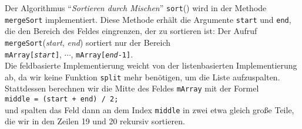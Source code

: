 Der Algorithmus ``\emph{Sortieren durch Mischen}'' \texttt{sort}() wird in der Methode
\texttt{mergeSort} implementiert.  Diese Methode erh\"alt die Argumente  \texttt{start} und
\texttt{end}, die den  Bereich des Feldes eingrenzen, der zu sortieren ist: 
Der Aufruf \texttt{mergeSort}(\textsl{start}, \textsl{end}) sortiert nur der Bereich \\[0.1cm]
\hspace*{1.3cm} \texttt{mArray[\textsl{start}]}, $\cdots$, \texttt{mArray[\textsl{end}-1]}. \\[0.1cm]
Die feldbasierte Implementierung  weicht von der listenbasierten Implementierung ab, da
wir keine Funktion \texttt{split} mehr ben\"otigen, um die Liste aufzuspalten. 
Stattdessen berechnen wir die Mitte des Feldes
\texttt{mArray} mit der Formel \\[0.1cm]
\hspace*{1.3cm} \texttt{middle = (start + end) / 2;} \\[0.1cm]
und spalten das Feld dann an dem Index \texttt{middle} in zwei etwa gleich gro{\ss}e
Teile, die wir in den Zeilen 19 und 20 rekursiv sortieren.

